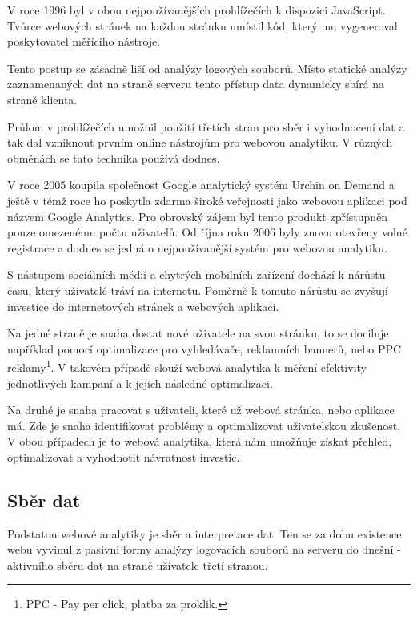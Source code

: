 \documentclass[bc,male,java,dept456]{diploma}						%
\begin{document}
V roce 1996 byl v obou nejpoužívanějších prohlížečích\cite{browser_market_share} k dispozici JavaScript. Tvůr\-ce webových stránek na každou stránku umístil kód, který mu vygeneroval poskytovatel měřícího nástroje. 

Tento postup se zásadně liší od analýzy logových souborů. Místo statické analýzy zaznamenaných dat na straně serveru tento přístup data dynamicky sbírá na straně klienta.

Průlom v prohlížečích umožnil použití třetích stran pro sběr i vyhodnocení dat a tak dal vzniknout prvním online nástrojům pro webovou analytiku. V různých obměnách se tato technika používá dodnes.

V roce 2005 koupila\cite{urchin} společnost Google analytický systém Urchin on Demand a ještě v témž roce ho poskytla zdarma široké veřejnosti jako webovou aplikaci pod názvem Google Analytics. Pro obrovský zájem byl tento produkt zpřístupněn pouze omezenému počtu uživatelů. Od října roku 2006 byly znovu otevřeny volné registrace a dodnes se jedná o nejpoužívanější systém pro webovou analytiku.

S nástupem sociálních médií a chytrých mobilních zařízení dochází k nárůstu času, který uživatelé tráví na internetu. Poměrně k tomuto nárůstu se zvyšují investice do internetových stránek a webových aplikací. 

Na jedné straně je snaha dostat nové uživatele na svou stránku, to se dociluje na\-pří\-klad pomocí optimalizace pro vyhledávače, reklamních bannerů, nebo PPC reklamy\footnote{PPC - Pay per click, platba za proklik.}. V ta\-ko\-vém případě slouží webová analytika k měření efektivity jednotlivých kampaní a k jejich následné optimalizaci.

Na druhé je snaha pracovat s uživateli, které už webová stránka, nebo aplikace má. Zde je snaha identifikovat problémy a optimalizovat uživatelskou zkušenost. V obou případech je to webová analytika, která nám umožňuje získat přehled, optimalizovat a vyhodnotit návratnost investic.










\subsection{Sběr dat}

Podstatou webové analytiky je sběr a interpretace dat. Ten se za dobu existence webu vyvinul z pasivní formy analýzy logovacích souborů na serveru do dnešní - aktivního sběru dat na straně uživatele třetí stranou.
\end{document}

